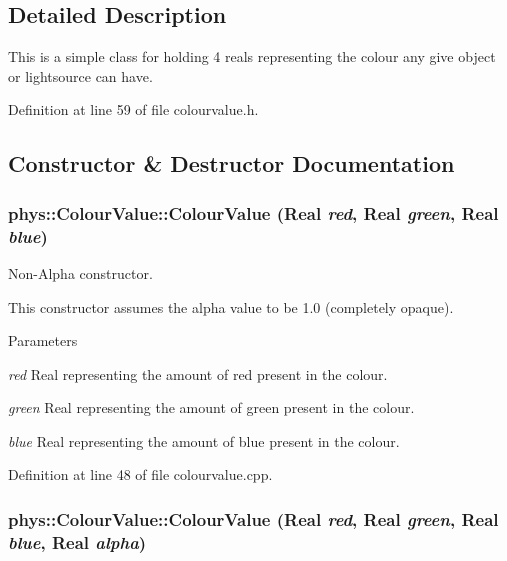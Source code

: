 \subsection{Detailed Description}
This is a simple class for holding 4 reals representing the colour any give object or lightsource can have. 

Definition at line 59 of file colourvalue.h.



\subsection{Constructor \& Destructor Documentation}
\hypertarget{classphys_1_1ColourValue_ac63b5fbf1b35b1855330ed5737fc16e0}{
\subsubsection[{ColourValue}]{\setlength{\rightskip}{0pt plus 5cm}phys::ColourValue::ColourValue ({\bf Real} {\em red}, \/  {\bf Real} {\em green}, \/  {\bf Real} {\em blue})}}
\label{d3/db0/classphys_1_1ColourValue_ac63b5fbf1b35b1855330ed5737fc16e0}


Non-\/Alpha constructor. 

This constructor assumes the alpha value to be 1.0 (completely opaque). 
\begin{DoxyParams}{Parameters}
\item[{\em red}]Real representing the amount of red present in the colour. \item[{\em green}]Real representing the amount of green present in the colour. \item[{\em blue}]Real representing the amount of blue present in the colour. \end{DoxyParams}


Definition at line 48 of file colourvalue.cpp.

\hypertarget{classphys_1_1ColourValue_a28ee2493cd6a7bb8bc4104d223e3e709}{
\subsubsection[{ColourValue}]{\setlength{\rightskip}{0pt plus 5cm}phys::ColourValue::ColourValue ({\bf Real} {\em red}, \/  {\bf Real} {\em green}, \/  {\bf Real} {\em blue}, \/  {\bf Real} {\em alpha})}}
\label{d3/db0/classphys_1_1ColourValue_a28ee2493cd6a7bb8bc4104d223e3e709}



